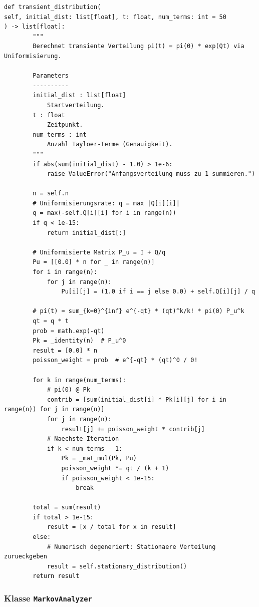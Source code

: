 ﻿\documentclass[a4paper,12pt]{scrreprt}
\theoremstyle{definition}
\begin{document}
\begin{lstlisting}[style=python, caption={Uniformisierungsverfahren für die transiente Verteilung (Auszug)}, label=lst:uniformization]
def transient_distribution(
self, initial_dist: list[float], t: float, num_terms: int = 50
) -> list[float]:
        """
        Berechnet transiente Verteilung pi(t) = pi(0) * exp(Qt) via Uniformisierung.

        Parameters
        ----------
        initial_dist : list[float]
            Startverteilung.
        t : float
            Zeitpunkt.
        num_terms : int
            Anzahl Tayloer-Terme (Genauigkeit).
        """
        if abs(sum(initial_dist) - 1.0) > 1e-6:
            raise ValueError("Anfangsverteilung muss zu 1 summieren.")

        n = self.n
        # Uniformisierungsrate: q = max |Q[i][i]|
        q = max(-self.Q[i][i] for i in range(n))
        if q < 1e-15:
            return initial_dist[:]

        # Uniformisierte Matrix P_u = I + Q/q
        Pu = [[0.0] * n for _ in range(n)]
        for i in range(n):
            for j in range(n):
                Pu[i][j] = (1.0 if i == j else 0.0) + self.Q[i][j] / q

        # pi(t) = sum_{k=0}^{inf} e^{-qt} * (qt)^k/k! * pi(0) P_u^k
        qt = q * t
        prob = math.exp(-qt)
        Pk = _identity(n)  # P_u^0
        result = [0.0] * n
        poisson_weight = prob  # e^{-qt} * (qt)^0 / 0!

        for k in range(num_terms):
            # pi(0) @ Pk
            contrib = [sum(initial_dist[i] * Pk[i][j] for i in range(n)) for j in range(n)]
            for j in range(n):
                result[j] += poisson_weight * contrib[j]
            # Naechste Iteration
            if k < num_terms - 1:
                Pk = _mat_mul(Pk, Pu)
                poisson_weight *= qt / (k + 1)
                if poisson_weight < 1e-15:
                    break

        total = sum(result)
        if total > 1e-15:
            result = [x / total for x in result]
        else:
            # Numerisch degeneriert: Stationaere Verteilung zurueckgeben
            result = self.stationary_distribution()
        return result
\end{lstlisting}

\subsubsection{Klasse \texttt{MarkovAnalyzer}}
\end{document}
